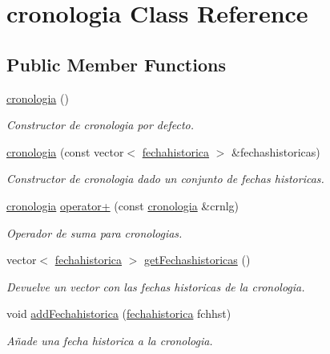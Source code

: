 \hypertarget{classcronologia}{}\section{cronologia Class Reference}
\label{classcronologia}
\subsection*{Public Member Functions}
\begin{DoxyCompactItemize}
\item 
\hyperlink{classcronologia_a1c4153db933d3928fb2e770f7f6ddd61}{cronologia} ()\hypertarget{classcronologia_a1c4153db933d3928fb2e770f7f6ddd61}{}\label{classcronologia_a1c4153db933d3928fb2e770f7f6ddd61}

\begin{DoxyCompactList}\small\item\em Constructor de cronologia por defecto. \end{DoxyCompactList}\item 
\hyperlink{classcronologia_ae3adaf940ef03081fa3cc2d0e585b27e}{cronologia} (const vector$<$ \hyperlink{classfechahistorica}{fechahistorica} $>$ \&fechashistoricas)
\begin{DoxyCompactList}\small\item\em Constructor de cronologia dado un conjunto de fechas historicas. \end{DoxyCompactList}\item 
\hyperlink{classcronologia}{cronologia} \hyperlink{classcronologia_a47651c512708d3634b4c2757d644bddb}{operator+} (const \hyperlink{classcronologia}{cronologia} \&crnlg)
\begin{DoxyCompactList}\small\item\em Operador de suma para cronologias. \end{DoxyCompactList}\item 
vector$<$ \hyperlink{classfechahistorica}{fechahistorica} $>$ \hyperlink{classcronologia_a8246996c2424fd835e80aa7cdb08c173}{get\+Fechashistoricas} ()
\begin{DoxyCompactList}\small\item\em Devuelve un vector con las fechas historicas de la cronologia. \end{DoxyCompactList}\item 
void \hyperlink{classcronologia_ae7b030e249d25216ec31fecbdf1d491f}{add\+Fechahistorica} (\hyperlink{classfechahistorica}{fechahistorica} fchhst)
\begin{DoxyCompactList}\small\item\em Añade una fecha historica a la cronologia. \end{DoxyCompactList}\item 

\end{DoxyCompactItemize}
